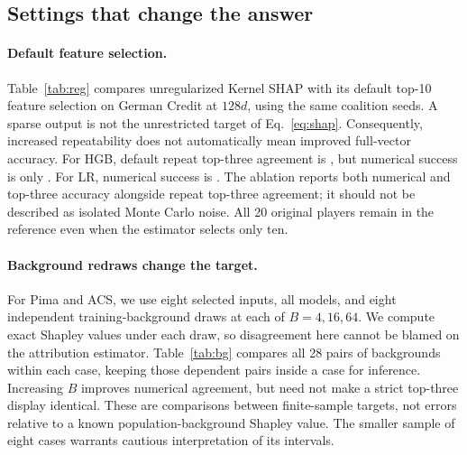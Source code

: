 \subsection{Settings that change the answer}
\label{sec:ablations}
\paragraph{Default feature selection.}
Table~\ref{tab:reg} compares unregularized Kernel SHAP with its default top-10 feature selection on German Credit at $128d$, using the same coalition seeds. A sparse output is not the unrestricted target of Eq.~\eqref{eq:shap}. Consequently, increased repeatability does not automatically mean improved full-vector accuracy. For HGB, default repeat top-three agreement is \DefaultHGBRepeat{}, but numerical success is only \DefaultHGBNumeric{}. For LR, numerical success is \DefaultLRNumeric{}. The ablation reports both numerical and top-three accuracy alongside repeat top-three agreement; it should not be described as isolated Monte Carlo noise. All 20 original players remain in the reference even when the estimator selects only ten.

\begin{table}[t]
\centering\small

\caption{German, $128d$: numerical correctness, top-three correctness and repeat top-three agreement. Percent with 95\% case-bootstrap intervals. ``Top 10'' is the actual SHAP 0.51.0 default, not an assumed default for other versions. Coalition seeds are paired with the unregularized condition.}
\label{tab:reg}
\end{table}

\paragraph{Background redraws change the target.}
For Pima and ACS, we use eight selected inputs, all models, and eight independent training-background draws at each of $B=4,16,64$. We compute exact Shapley values under each draw, so disagreement here cannot be blamed on the attribution estimator. Table~\ref{tab:bg} compares all 28 pairs of backgrounds within each case, keeping those dependent pairs inside a case for inference. Increasing $B$ improves numerical agreement, but need not make a strict top-three display identical. These are comparisons between finite-sample targets, not errors relative to a known population-background Shapley value. The smaller sample of eight cases warrants cautious interpretation of its intervals.


